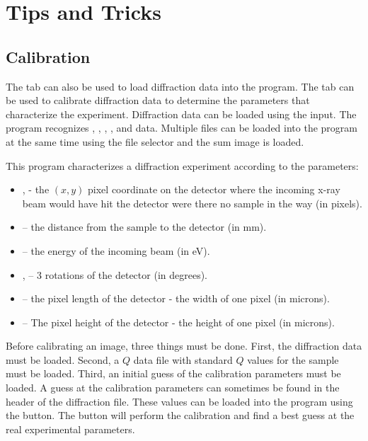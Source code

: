 \chapter{Tips and Tricks}

\section{Calibration}

The  tab can also be used to load
diffraction data into the program. The tab can
be used to calibrate diffraction data to determine the 
parameters that characterize the experiment. 
Diffraction data can be loaded using the  input. 
The program recognizes , , 
, , and  data. 
Multiple files can be loaded into the program at the same
time using the file selector and the sum image is loaded.

This program characterizes a diffraction experiment 
according to the parameters:
\index{$\alpha$}
\index{$\beta$}
\begin{itemize}
    \item {},  - the $(x,y)$ pixel coordinate 
    on the detector where the incoming 
    x-ray beam would have hit the detector were there 
    no sample in the way (in pixels).
    \item {} -- the distance from the sample to 
    the detector (in mm).
    \item {} -- the energy of the incoming beam (in eV).
    \item {},   -- 3 rotations of 
    the detector (in degrees).
    \item {} -- the pixel length of the detector - 
    the width of one pixel (in microns).
    \item {} -- The pixel height of the detector -
    the height of one pixel (in microns).
\end{itemize}
Before calibrating an image, three things must be done. 
First, the diffraction data must be loaded.
Second, a $Q$ data file with standard $Q$ values for the
sample must be loaded.
Third, an initial guess of the calibration parameters must be
loaded. A guess at the calibration parameters can sometimes
be found in the header of the diffraction file. These values
can be loaded into the program using the  
button.  The  button will perform the calibration 
and find a best guess at the real experimental parameters.

